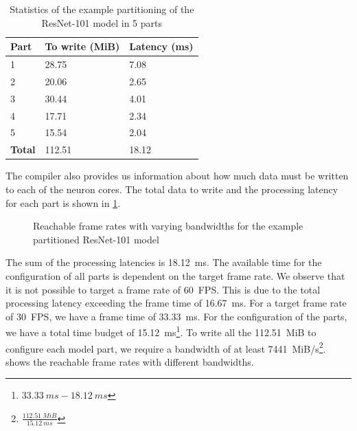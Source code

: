 \begin{table}[hbtp]
\centering
\begin{tabular}{@{}lll@{}}
\toprule
\textbf{Part}  & \textbf{To write (MiB)} & \textbf{Latency (ms)} \\ \midrule
1              & 28.75                   & 7.08                  \\
2              & 20.06                   & 2.65                  \\
3              & 30.44                   & 4.01                  \\
4              & 17.71                   & 2.34                  \\
5              & 15.54                   & 2.04                  \\ \midrule
\textbf{Total} & 112.51                  & 18.12                 \\ \bottomrule
\end{tabular}
\caption{Statistics of the example partitioning of the ResNet-101 model in 5 parts}
\label{tab:resnet101_5parts}
\end{table}

The compiler also provides us information about how much data must be written to each of the neuron cores.
The total data to write and the processing latency for each part is shown in \cref{tab:resnet101_5parts}.

\begin{figure}[hbtp]
    \centering
    
    \caption{Reachable frame rates with varying bandwidths for the example partitioned ResNet-101 model}
    \label{fig:large_model_bandwidth_analysis_example_resnet101}
\end{figure}

The sum of the processing latencies is \SI{18.12}{ms}.
The available time for the configuration of all parts is dependent on the target frame rate.
We observe that it is not possible to target a frame rate of \SI{60}{FPS}.
This is due to the total processing latency exceeding the frame time of \SI{16.67}{ms}. 
For a target frame rate of \SI{30}{FPS}, we have a frame time of \SI{33.33}{ms}.
For the configuration of the parts, we have a total time budget of \SI{15.12}{ms}\footnote{$\SI{33.33}{ms} - \SI{18.12}{ms}$}.
To write all the \SI{112.51}{MiB} to configure each model part, we require a bandwidth of at least \SI{7441}{MiB/s}\footnote{$\frac{\SI{112.51}{MiB}}{\SI{15.12}{ms}}$}.
 shows the reachable frame rates with different bandwidths.

